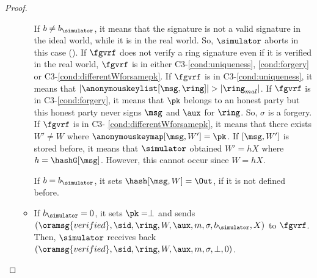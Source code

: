 \begin{proof}
\begin{itemize}
\begin{itemize}
			 If $ b \neq b_\simulator $, it means that the signature is not a valid signature in the ideal world, while it is in the real world. So, $ \simulator $ aborts in this case ().
				If $ \fgvrf $ does not verify a ring signature even if  it is verified in the real world, $ \fgvrf $ is in either C3-\ref{cond:uniqueness}, \ref{cond:forgery} or C3-\ref{cond:differentWforsamepk}.
				If $ \fgvrf $ is in C3-\ref{cond:uniqueness}, it means that $ |\anonymouskeylist[\msg,\ring]|> |\ring_{mal}| $. If $ \fgvrf $ is in C3-\ref{cond:forgery}, it means that $ \pk$ belongs to an honest party but this honest party never signs $ \msg $ and $ \aux $ for  $ \ring $. So, $ \sigma $ is a forgery.	 If $ \fgvrf $ is in C3- \ref{cond:differentWforsamepk}, it means that there exists $ W' \neq W $ where $ \anonymouskeymap[\msg,W'] = \pk$. If $ [\msg,W'] $ is stored before, it means that $ \simulator $ obtained $ W' = hX $ where $ h =\mathtt{\hashG}[\msg] $.  However, this cannot occur since $ W = hX $.
			
				 If $ b = b_\simulator $, it sets $\mathtt{\hash}[\msg,W] = \Out $, if it is not defined before.
				

			\item If $ b_\simulator = 0 $, it sets $ \pk = \perp $ and sends  $ (\oramsg{verified}, \allowbreak \sid, \allowbreak \ring, \allowbreak W, \allowbreak \aux, m, \sigma, b_\simulator, X) $ to $ \fgvrf $. Then, $ \simulator $ receives back $ (\oramsg{verified}, \allowbreak \sid, \allowbreak \ring, \allowbreak W, \aux,m, \sigma, \perp, 0) $. 
			

\end{itemize}
\end{itemize}
\end{proof}
